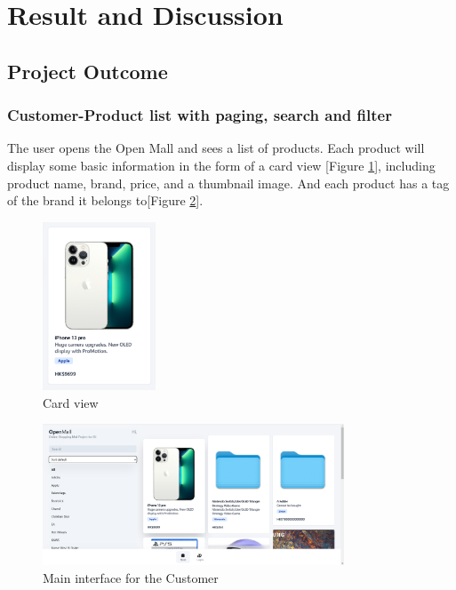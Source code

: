 \documentclass{article}
\begin{document}
\clearpage

\section{Result and Discussion}

\subsection{Project Outcome}

\subsubsection{Customer-Product list with paging, search and filter}
The user opens the Open Mall and sees a list of products. Each product will display some basic information in the form of a card view [Figure \ref{fig:card view}], including product name, brand, price, and a thumbnail image. And each product has a tag of the brand it belongs to[Figure \ref{fig:product list}].

\begin{figure}[!htp]
    \centering
    \includegraphics[width=0.3\textwidth]{card view 2.png}
    \caption{\label{fig:card view}Card view}
\end{figure}

\begin{figure}[!htp]
    \centering
    \includegraphics[width=0.8\textwidth]{product list.png}
    \caption{\label{fig:product list}Main interface for the Customer}
\end{figure}
\end{document}
